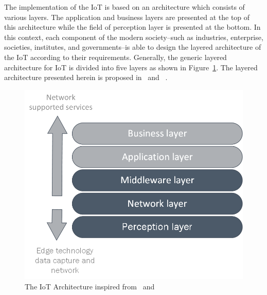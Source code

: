 The implementation of the IoT is based on an architecture which consists of various layers. The application and business layers are presented at the top of this architecture while the field of perception layer is presented at the bottom. In this context, each component of the modern society--such as industries, enterprise, societies, institutes, and governments--is able to design the layered architecture of the IoT according to their requirements. Generally, the generic layered architecture for IoT is divided into five layers as shown in Figure~\ref{fig:contrib2:layer}. The layered architecture presented herein is proposed in~\cite{res1} and ~\cite{res2}.
\begin{figure}[htbp]
    \centering
    \includegraphics[width=.9\textwidth]{resources/images/iotarchi}
    \caption{The IoT Architecture inspired from~\cite{hindi} and~\cite{rep2}}\label{fig:contrib2:layer}
\end{figure}


